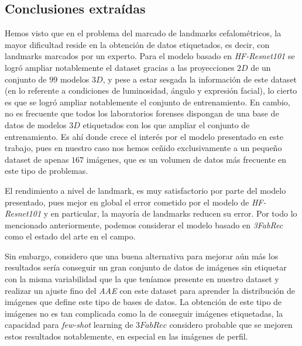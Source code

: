         \subsection{Conclusiones extraídas}

            \noindent Hemos visto que en el problema del marcado de landmarks cefalométricos, la mayor dificultad reside en la obtención de datos etiquetados, es decir, con landmarks marcados por un experto. Para el modelo basado en \textit{HF-Resnet101} se logró ampliar notablemente el dataset gracias a las proyecciones $2D$ de un conjunto de $99$ modelos $3D$, y pese a estar sesgada la información de este dataset (en lo referente a condiciones de luminosidad, ángulo y expresión facial), lo cierto es que se logró ampliar notablemente el conjunto de entrenamiento. En cambio, no es frecuente que todos los laboratorios forenses dispongan de una base de datos de modelos $3D$ etiquetados con los que ampliar el conjunto de entrenamiento. Es ahí donde crece el interés por el modelo presentado en este trabajo, pues en nuestro caso nos hemos ceñido exclusivamente a un pequeño dataset de apenas $167$ imágenes, que es un volumen de datos más frecuente en este tipo de problemas.
            
            \medskip

            \noindent El rendimiento a nivel de landmark, es muy satisfactorio por parte del modelo presentado, pues mejor en global el error cometido por el modelo de \textit{HF-Resnet101} y en particular, la mayoría de landmarks reducen su error. Por todo lo mencionado anteriormente, podemos considerar el modelo basado en \textit{3FabRec} como el estado del arte en el campo. 
            
            
            \medskip
            
            \noindent Sin embargo, considero que una buena alternativa para mejorar aún más los resultados sería conseguir un gran conjunto de datos de imágenes sin etiquetar con la misma variabilidad que la que teníamos presente en nuestro dataset y realizar un ajuste fino del \textit{AAE} con este dataset para aprender la distribución de imágenes que define este tipo de bases de datos. La obtención de este tipo de imágenes no es tan complicada como la de conseguir imágenes etiquetadas, la capacidad para \textit{few-shot} learning de $3FabRec$ considero probable que se mejoren estos resultados notablemente, en especial en las imágenes de perfil.

            

\endinput



